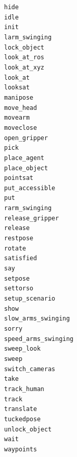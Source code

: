 \documentclass[compress]{beamer}
\begin{document}
{\begin{frame}{}
\begin{multicols}{4}
{\tt hide} \\
{\tt idle} \\
{\tt init} \\
{\tt larm\_swinging} \\
{\tt lock\_object} \\
{\tt look\_at\_ros} \\
{\tt look\_at\_xyz} \\
{\tt look\_at} \\
{\tt looksat} \\
{\tt manipose} \\
{\tt move\_head} \\
{\tt movearm} \\
{\tt moveclose} \\
{\tt open\_gripper} \\
{\tt pick} \\
{\tt place\_agent} \\
{\tt place\_object} \\
{\tt pointsat} \\
{\tt put\_accessible} \\
{\tt put} \\
{\tt rarm\_swinging} \\
{\tt release\_gripper} \\
{\tt release} \\
{\tt restpose} \\
{\tt rotate} \\
{\tt satisfied} \\
{\tt say} \\
{\tt setpose} \\
{\tt settorso} \\
{\tt setup\_scenario} \\
{\tt show} \\
{\tt slow\_arms\_swinging} \\
{\tt sorry} \\
{\tt speed\_arms\_swinging} \\
{\tt sweep\_look} \\
{\tt sweep} \\
{\tt switch\_cameras} \\
{\tt take} \\
{\tt track\_human} \\
{\tt track} \\
{\tt translate} \\
{\tt tuckedpose} \\
{\tt unlock\_object} \\
{\tt wait} \\
{\tt waypoints} \\
    \end{multicols}
\end{frame}
}
\end{document}
